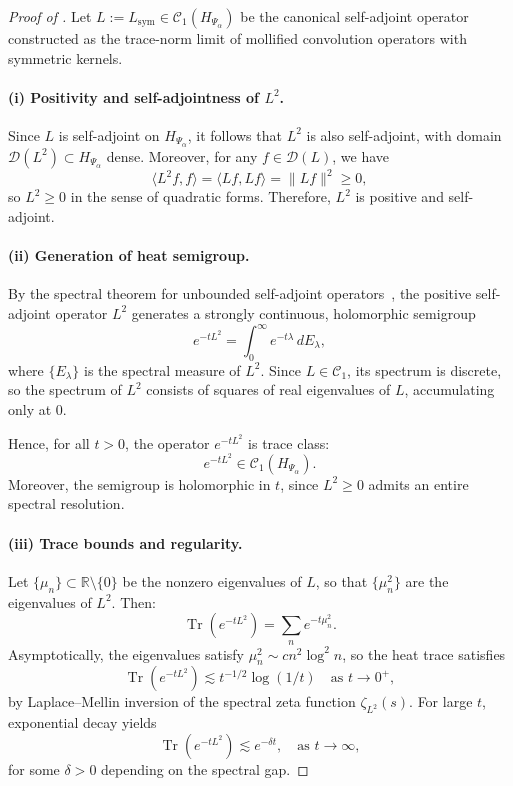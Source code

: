 \begin{proof}[Proof of ]
Let \( L := L_{\mathrm{sym}} \in \mathcal{C}_1(H_{\Psi_\alpha}) \) be the canonical self-adjoint operator constructed as the trace-norm limit of mollified convolution operators with symmetric kernels.

\paragraph{(i) Positivity and self-adjointness of \( L^2 \).}
Since \( L \) is self-adjoint on \( H_{\Psi_\alpha} \), it follows that \( L^2 \) is also self-adjoint, with domain \( \mathcal{D}(L^2) \subset H_{\Psi_\alpha} \) dense. Moreover, for any \( f \in \mathcal{D}(L) \), we have
\[
\langle L^2 f, f \rangle = \langle Lf, Lf \rangle = \| Lf \|^2 \ge 0,
\]
so \( L^2 \ge 0 \) in the sense of quadratic forms. Therefore, \( L^2 \) is positive and self-adjoint.

\paragraph{(ii) Generation of heat semigroup.}
By the spectral theorem for unbounded self-adjoint operators~\cite[Ch.~VIII]{ReedSimon1975II}, the positive self-adjoint operator \( L^2 \) generates a strongly continuous, holomorphic semigroup
\[
e^{-t L^2} = \int_0^\infty e^{-t\lambda} \, dE_\lambda,
\]
where \( \{E_\lambda\} \) is the spectral measure of \( L^2 \). Since \( L \in \mathcal{C}_1 \), its spectrum is discrete, so the spectrum of \( L^2 \) consists of squares of real eigenvalues of \( L \), accumulating only at 0.

Hence, for all \( t > 0 \), the operator \( e^{-t L^2} \) is trace class:
\[
e^{-t L^2} \in \mathcal{C}_1(H_{\Psi_\alpha}).
\]
Moreover, the semigroup is holomorphic in \( t \), since \( L^2 \ge 0 \) admits an entire spectral resolution.

\paragraph{(iii) Trace bounds and regularity.}
Let \( \{ \mu_n \} \subset \mathbb{R} \setminus \{0\} \) be the nonzero eigenvalues of \( L \), so that \( \{ \mu_n^2 \} \) are the eigenvalues of \( L^2 \). Then:
\[
\operatorname{Tr}(e^{-t L^2}) = \sum_n e^{-t \mu_n^2}.
\]
Asymptotically, the eigenvalues satisfy \( \mu_n^2 \sim c n^2 \log^2 n \), so the heat trace satisfies
\[
\operatorname{Tr}(e^{-t L^2}) \lesssim t^{-1/2} \log(1/t) \quad \text{as } t \to 0^+,
\]
by Laplace–Mellin inversion of the spectral zeta function \( \zeta_{L^2}(s) \). For large \( t \), exponential decay yields
\[
\operatorname{Tr}(e^{-t L^2}) \lesssim e^{-\delta t}, \quad \text{as } t \to \infty,
\]
for some \( \delta > 0 \) depending on the spectral gap.


\end{proof}
